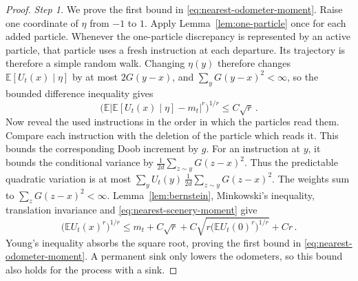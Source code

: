 \documentclass[11pt]{amsart}
\theoremstyle{plain}
\theoremstyle{definition}
\newcommand{\E}{\mathbb{E}}
\begin{document}
\begin{proof}
	\smallskip
	\noindent\emph{Step 1.} We prove the first bound in
	\eqref{eq:nearest-odometer-moment}. Raise one coordinate of $\eta$ from $-1$
	to $1$.
	Apply Lemma~\ref{lem:one-particle} once for each added particle. Whenever the one-particle discrepancy is represented by an active particle, that particle uses a fresh instruction at each departure. Its trajectory is therefore a simple random walk. Changing $\eta(y)$ therefore changes
	$\E[U_t(x)\mid\eta]$ by at most $2G(y-x)$, and $\sum_yG(y-x)^2<\infty$, so the bounded difference inequality gives
	\begin{equation}\label{eq:nearest-scenery-moment}
		\bigl(\E\bigl|\E[U_t(x)\mid\eta]-m_t\bigr|^r\bigr)^{1/r}
		\leq C\sqrt r\,.
	\end{equation}
	Now reveal the used instructions in the order in which the particles read them.
	Compare each instruction with the deletion of the particle which reads it.
	This bounds the corresponding Doob increment by $g$. For an instruction at
	$y$, it bounds the conditional variance by
	$\frac1{2d}\sum_{z\sim y}G(z-x)^2$. Thus the predictable quadratic variation
	is at most $\sum_yU_t(y)\,\frac1{2d}\sum_{z\sim y}G(z-x)^2$. The weights sum
	to $\sum_zG(z-x)^2<\infty$. Lemma~\ref{lem:bernstein},
	Minkowski's inequality, translation invariance and
	\eqref{eq:nearest-scenery-moment} give
	\[
		\bigl(\E U_t(x)^r\bigr)^{1/r}
		\leq m_t+C\sqrt r
		+C\sqrt{r\bigl(\E U_t(0)^r\bigr)^{1/r}}+Cr\,.
	\]
	Young's inequality absorbs the square root, proving the first bound in
	\eqref{eq:nearest-odometer-moment}. A permanent sink only lowers the
	odometers, so this bound also holds for the process with a sink.


\end{proof}
\end{document}
